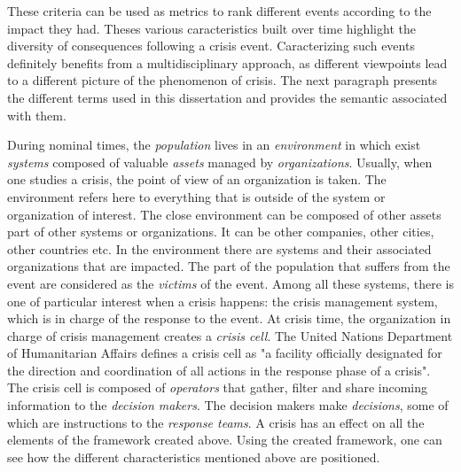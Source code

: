 These criteria can be used as metrics to rank different events according to the impact they had.
Theses various caracteristics built over time highlight the diversity of consequences following a crisis event.
Caracterizing such events definitely benefits from a multidisciplinary approach, as different viewpoints lead to a different picture of the phenomenon of crisis.
The next paragraph presents the different terms used in this dissertation and provides the
semantic associated with them.

During nominal times, the \emph{population} lives in an \emph{environment} in which exist \emph{systems} composed of valuable \emph{assets} managed by \emph{organizations}.
Usually, when one studies a crisis, the point of view of an organization is taken.
The environment refers here to everything that is outside of the system or organization of interest.
The close environment can be composed of other assets part of other systems or organizations.
It can be other companies, other cities, other countries etc.
In the environment there are systems and their associated organizations that are impacted.
The part of the population that suffers from the event are considered as the \emph{victims} of the event.
Among all these systems, there is one of particular interest when a crisis happens: the crisis management system, which is in charge of the response to the event.
At crisis time, the organization in charge of crisis management creates a \emph{crisis cell}.
The United Nations Department of Humanitarian Affairs defines a crisis cell as "a facility officially designated for the direction and coordination of all actions in the response phase of a crisis".
The crisis cell is composed of \emph{operators} that gather, filter and share incoming information to the \emph{decision makers}.
The decision makers make \emph{decisions}, some of which are instructions to the \emph{response teams}.
A crisis has an effect on all the elements of the framework created above.
Using the created framework, one can see how the different characteristics mentioned above are positioned.

